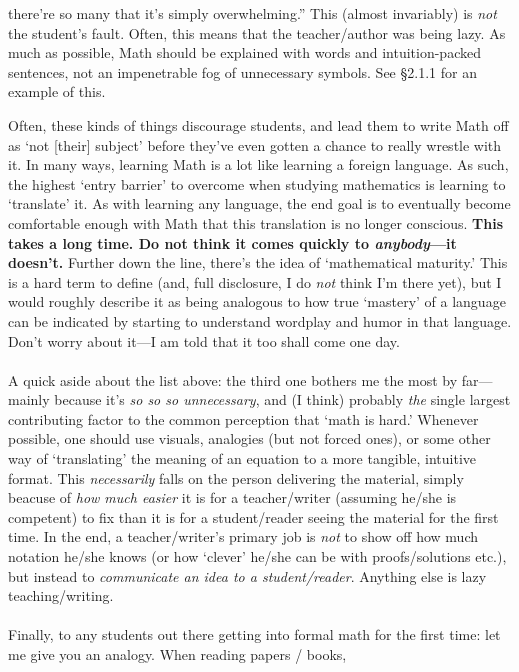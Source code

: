 \documentclass[10pt]{article}
\theoremstyle{definition}
\begin{document}
{\begin{enumerate}
      there're so many that it's simply overwhelming.''  This (almost
      invariably) is \emph{not} the student's fault.  Often, this
      means that the teacher/author was being lazy.  As much as
      possible, Math should be explained with words and
      intuition-packed sentences, not an impenetrable fog of
      unnecessary symbols.  See \S 2.1.1 for an example of this.
\end{enumerate}
Often, these kinds of things discourage students, and lead them to
write Math off as `not [their] subject' before they've even gotten a
chance to really wrestle with it.  In many ways, learning Math is a
lot like learning a foreign language.  As such, the highest `entry
barrier' to overcome when studying mathematics is learning to
`translate' it.  As with learning any language, the end goal is to
eventually become comfortable enough with Math that this translation
is no longer conscious.  \textbf{This takes a long time.  Do not think
  it comes quickly to \emph{anybody}---it doesn't.}  Further down the
line, there's the idea of `mathematical maturity.'  This is a hard
term to define (and, full disclosure, I do \emph{not} think I'm there
yet), but I would roughly describe it as being analogous to how true
`mastery' of a language can be indicated by starting to understand
wordplay and humor in that language.  Don't worry about it---I am told
that it too shall come one day.\\~\\
A quick aside about the list above: the third one bothers me the most
by far---mainly because it's \emph{so so so unnecessary}, and (I
think) probably \emph{the} single largest contributing factor to the
common perception that `math is hard.'  Whenever possible, one should
use visuals, analogies (but not forced ones), or some other way of
`translating' the meaning of an equation to a more tangible, intuitive
format.  This \emph{necessarily} falls on the person delivering the
material, simply beacuse of \emph{how much easier} it is for a
teacher/writer (assuming he/she is competent) to fix than it is for a
student/reader seeing the material for the first time.  In the end, a
teacher/writer's primary job is \emph{not} to show off how much
notation he/she knows (or how `clever' he/she can be with
proofs/solutions etc.), but instead to \emph{communicate an idea to a
  student/reader}.  Anything else is lazy teaching/writing.  \\~\\
Finally, to any students out there getting into formal math for the
first time: let me give you an analogy.  When reading papers / books,
}
\end{document}
